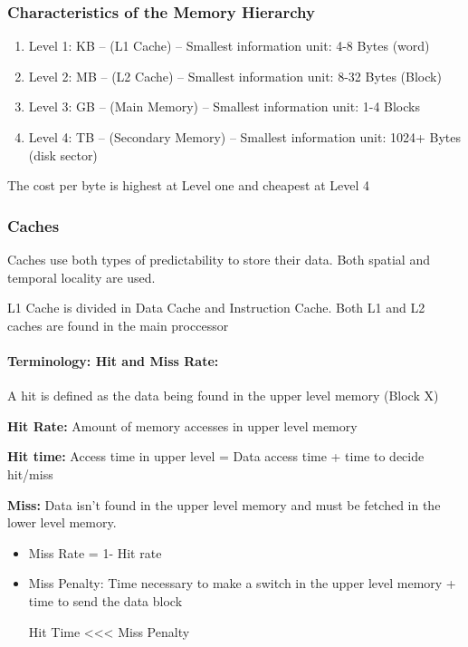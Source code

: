 \documentclass{article}
\begin{document}
\subsubsection{Characteristics of the Memory Hierarchy}

\begin{enumerate}
  \item Level 1: KB -- (L1 Cache) -- Smallest information unit: 4-8 Bytes (word)
  \item Level 2: MB -- (L2 Cache) -- Smallest information unit: 8-32 Bytes (Block)
  \item Level 3: GB -- (Main Memory) -- Smallest information unit: 1-4 Blocks
  \item Level 4: TB -- (Secondary Memory) -- Smallest information unit: 1024+ Bytes (disk sector)
\end{enumerate}

The cost per byte is highest at Level one and cheapest at Level 4

\subsubsection{Caches}
Caches use both types of predictability to store their data. Both spatial and temporal locality are used.


L1 Cache is divided in Data Cache and Instruction Cache. Both L1 and L2 caches are found in the main proccessor

\paragraph{Terminology: Hit and Miss Rate: } A hit is defined as the data being found in the upper level memory (Block X)

\textbf{Hit Rate: } Amount of memory accesses in upper level memory

\textbf{Hit time: } Access time in upper level = Data access time + time to decide hit/miss 

\textbf{Miss: } Data isn't found in the upper level memory and must be fetched in the lower level memory.

\begin{itemize}
  \item Miss Rate = 1- Hit rate
  \item Miss Penalty: Time necessary to make a switch in the upper level memory + time to send the data block 
  
  Hit Time <<< Miss Penalty
\end{itemize}
\end{document}
